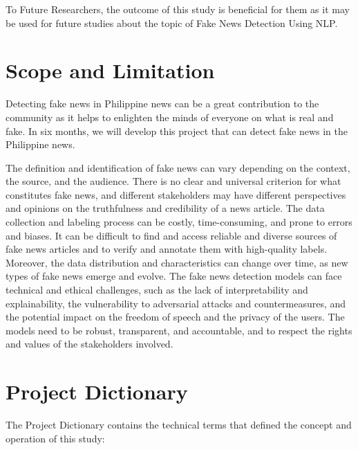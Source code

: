 \begin{refsection}
To Future Researchers, the outcome of this study is beneficial for them as it may be used for future studies about the topic of Fake News Detection Using NLP.


\section{Scope and Limitation}

Detecting fake news in Philippine news can be a great contribution to the community as it helps to enlighten the minds of everyone on what is real and fake. In six months, we will develop this project that can detect fake news in the Philippine news. 


The definition and identification of fake news can vary depending on the context, the source, and the audience. There is no clear and universal criterion for what constitutes fake news, and different stakeholders may have different perspectives and opinions on the truthfulness and credibility of a news article. The data collection and labeling process can be costly, time-consuming, and prone to errors and biases. It can be difficult to find and access reliable and diverse sources of fake news articles and to verify and annotate them with high-quality labels. Moreover, the data distribution and characteristics can change over time, as new types of fake news emerge and evolve. The fake news detection models can face technical and ethical challenges, such as the lack of interpretability and explainability, the vulnerability to adversarial attacks and countermeasures, and the potential impact on the freedom of speech and the privacy of the users. The models need to be robust, transparent, and accountable, and to respect the rights and values of the stakeholders involved.

\section{Project Dictionary}

The Project Dictionary contains the technical terms that defined the concept and operation of this study:


\end{refsection}
